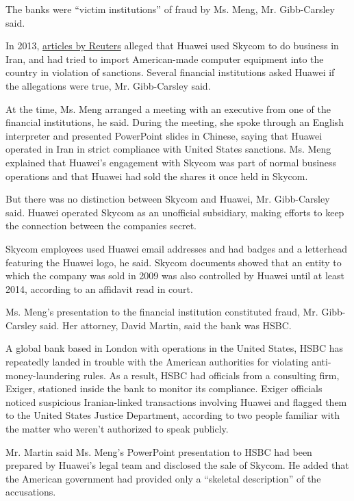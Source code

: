 The banks were ``victim institutions'' of fraud by Ms. Meng, Mr.
Gibb-Carsley said.

In 2013,
\href{https://www.reuters.com/article/us-huawei-skycom/exclusive-huawei-cfo-linked-to-firm-that-offered-hp-gear-to-iran-idUSBRE90U0CC20130131}{articles
by Reuters} alleged that Huawei used Skycom to do business in Iran, and
had tried to import American-made computer equipment into the country in
violation of sanctions. Several financial institutions asked Huawei if
the allegations were true, Mr. Gibb-Carsley said.

At the time, Ms. Meng arranged a meeting with an executive from one of
the financial institutions, he said. During the meeting, she spoke
through an English interpreter and presented PowerPoint slides in
Chinese, saying that Huawei operated in Iran in strict compliance with
United States sanctions. Ms. Meng explained that Huawei's engagement
with Skycom was part of normal business operations and that Huawei had
sold the shares it once held in Skycom.

But there was no distinction between Skycom and Huawei, Mr. Gibb-Carsley
said. Huawei operated Skycom as an unofficial subsidiary, making efforts
to keep the connection between the companies secret.

Skycom employees used Huawei email addresses and had badges and a
letterhead featuring the Huawei logo, he said. Skycom documents showed
that an entity to which the company was sold in 2009 was also controlled
by Huawei until at least 2014, according to an affidavit read in court.

Ms. Meng's presentation to the financial institution constituted fraud,
Mr. Gibb-Carsley said. Her attorney, David Martin, said the bank was
HSBC.

A global bank based in London with operations in the United States, HSBC
has repeatedly landed in trouble with the American authorities for
violating anti-money-laundering rules. As a result, HSBC had officials
from a consulting firm, Exiger, stationed inside the bank to monitor its
compliance. Exiger officials noticed suspicious Iranian-linked
transactions involving Huawei and flagged them to the United States
Justice Department, according to two people familiar with the matter who
weren't authorized to speak publicly.

Mr. Martin said Ms. Meng's PowerPoint presentation to HSBC had been
prepared by Huawei's legal team and disclosed the sale of Skycom. He
added that the American government had provided only a ``skeletal
description'' of the accusations.

